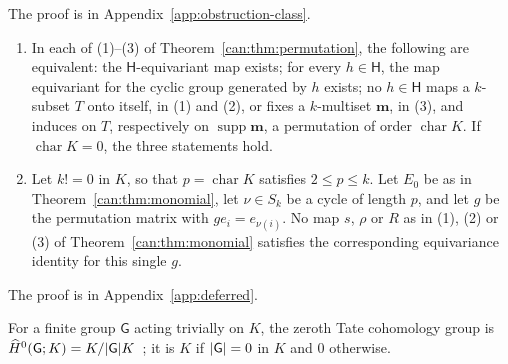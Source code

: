 The proof is in Appendix~\ref{app:obstruction-class}.

\begin{corollary}\label{can:cor:p-cycle}
\begin{enumerate}
\item In each of (1)--(3) of Theorem~\ref{can:thm:permutation}, the following are equivalent: the
$\mathsf H$\nobreakdash-equivariant map exists; for every $h\in\mathsf H$, the map equivariant for the cyclic group
generated by $h$ exists; no $h\in\mathsf H$ maps a $k$\nobreakdash-subset $T$ onto itself, in (1) and (2), or fixes a
$k$\nobreakdash-multiset $\mathbf m$, in (3), and induces on $T$, respectively on $\operatorname{supp}\mathbf m$, a
permutation of order $\operatorname{char}K$. If $\operatorname{char}K=0$, the three statements hold.
\item Let $k!=0$ in $K$, so that $p=\operatorname{char}K$ satisfies $2\le p\le k$. Let $E_0$ be as in
Theorem~\ref{can:thm:monomial}, let $\nu\in S_k$ be a cycle of length $p$, and let $g$ be the permutation matrix with
$ge_i=e_{\nu(i)}$. No map $s$, $\rho$ or $R$ as in (1), (2) or (3) of Theorem~\ref{can:thm:monomial} satisfies the
corresponding equivariance identity for this single $g$.
\end{enumerate}
\end{corollary}

The proof is in Appendix~\ref{app:deferred}.

For a finite group $\mathsf G$ acting trivially on $K$, the zeroth Tate cohomology group is
$\widehat H^0(\mathsf G;K)=K/\lvert \mathsf G\rvert K$~\cite[Ch.~VI]{Br}; it is $K$ if $\lvert \mathsf G\rvert=0$ in $K$ and $0$
otherwise.

